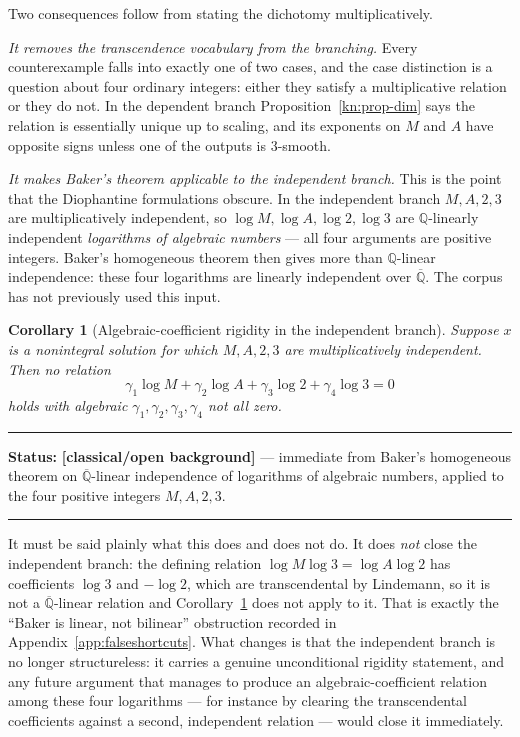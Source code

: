 \documentclass[11pt,oneside]{article}
\newtheorem{corollary}[theorem]{Corollary}
\theoremstyle{definition}
\theoremstyle{remark}
\newcommand{\Q}{\mathbb Q}
\newcommand{\Abar}{\overline{\mathbb Q}}
\newcommand{\Qbar}{\Abar}
\newcommand{\statusknown}{\textcolor{classicalgray}{\textbf{[classical/\allowbreak open background]}}}
\newenvironment{statusbox}[1]
{\begin{center}\begin{minipage}{0.94\textwidth}\raggedright\hbadness=10000\hrule
\vspace{0.45em}\textbf{Status:} #1\par\vspace{0.35em}}
{\vspace{0.35em}\hrule\end{minipage}\end{center}}
\begin{document}
Two consequences follow from stating the dichotomy multiplicatively.

\emph{It removes the transcendence vocabulary from the branching.}  Every counterexample
falls into exactly one of two cases, and the case distinction is a question about four
ordinary integers: either they satisfy a multiplicative relation or they do not.  In the
dependent branch Proposition~\ref{kn:prop-dim} says the relation is essentially unique up to
scaling, and its exponents on $M$ and $A$ have opposite signs unless one of the outputs is
$3$-smooth.

\emph{It makes Baker's theorem applicable to the independent branch.}  This is the point that
the Diophantine formulations obscure.  In the independent branch $M,A,2,3$ are
multiplicatively independent, so $\log M,\log A,\log2,\log3$ are $\Q$-linearly independent
\emph{logarithms of algebraic numbers} --- all four arguments are positive integers.  Baker's
homogeneous theorem then gives more than $\Q$-linear independence: these four logarithms are
linearly independent over $\Qbar$.  The corpus has not previously used this input.

\begin{corollary}[Algebraic-coefficient rigidity in the independent branch]
\label{kn:cor-baker}
Suppose $x$ is a nonintegral solution for which $M,A,2,3$ are multiplicatively independent.
Then no relation
\[
  \gamma_1\log M+\gamma_2\log A+\gamma_3\log2+\gamma_4\log3=0
\]
holds with algebraic $\gamma_1,\gamma_2,\gamma_3,\gamma_4$ not all zero.
\end{corollary}

\begin{statusbox}{\statusknown{} --- immediate from Baker's homogeneous theorem on
$\Qbar$-linear independence of logarithms of algebraic numbers, applied to the four positive
integers $M,A,2,3$.}
\end{statusbox}

It must be said plainly what this does and does not do.  It does \emph{not} close the
independent branch: the defining relation $\log M\log3=\log A\log2$ has coefficients $\log3$
and $-\log2$, which are transcendental by Lindemann, so it is not a $\Qbar$-linear relation
and Corollary~\ref{kn:cor-baker} does not apply to it.  That is exactly the ``Baker is linear,
not bilinear'' obstruction recorded in Appendix~\ref{app:falseshortcuts}.  What changes is
that the independent branch is no longer structureless: it carries a genuine unconditional
rigidity statement, and any future argument that manages to produce an algebraic-coefficient
relation among these four logarithms --- for instance by clearing the transcendental
coefficients against a second, independent relation --- would close it immediately.
\end{document}

